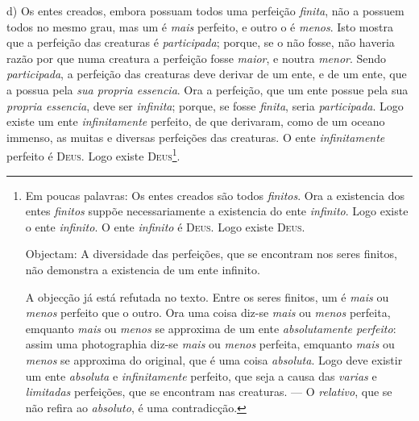  d) Os entes creados, embora possuam todos uma perfeição \emph{finita}, não a possuem todos no mesmo grau, mas um é \emph{mais} perfeito, e outro o é \emph{menos}. Isto mostra que a perfeição das creaturas é \emph{participada}; porque, se o não fosse, não haveria razão por que numa creatura a perfeição fosse \emph{maior}, e noutra \emph{menor}. Sendo \emph{participada}, a perfeição das creaturas deve derivar de um ente, e de um ente, que a possua pela \emph{sua propria essencia}. Ora a perfeição, que um ente possue pela sua \emph{propria essencia}, deve ser \emph{infinita}; porque, se fosse \emph{finita}, seria \emph{participada}. Logo existe um ente \emph{infinitamente} perfeito, de que derivaram, como de um oceano immenso, as muitas e diversas perfeições das creaturas. O ente \emph{infinitamente} perfeito é \textsc{Deus}. Logo existe \textsc{Deus}\footnote{Em poucas palavras: Os entes creados são todos \emph{finitos}. Ora a existencia dos entes \emph{finitos} suppõe necessariamente a existencia do ente \emph{infinito}. Logo existe o ente \emph{infinito}. O ente \emph{infinito} é \textsc{Deus}. Logo existe \textsc{Deus}.\par Objectam: A diversidade das perfeições, que se encontram nos seres finitos, não demonstra a existencia de um ente infinito.\par A objecção já está refutada no texto. Entre os seres finitos, um é \emph{mais} ou \emph{menos} perfeito que o outro. Ora uma coisa diz-se \emph{mais} ou \emph{menos} perfeita, emquanto \emph{mais} ou \emph{menos} se approxima de um ente \emph{absolutamente perfeito}: assim uma photographia diz-se \emph{mais} ou \emph{menos} perfeita, emquanto \emph{mais} ou \emph{menos} se approxima do original, que é uma coisa \emph{absoluta}. Logo deve existir um ente \emph{absoluta} e \emph{infinitamente} perfeito, que seja a causa das \emph{varias} e \emph{limitadas} perfeições, que se encontram nas creaturas. --- O \emph{relativo}, que se não refira ao \emph{absoluto}, é uma contradicção.}.


